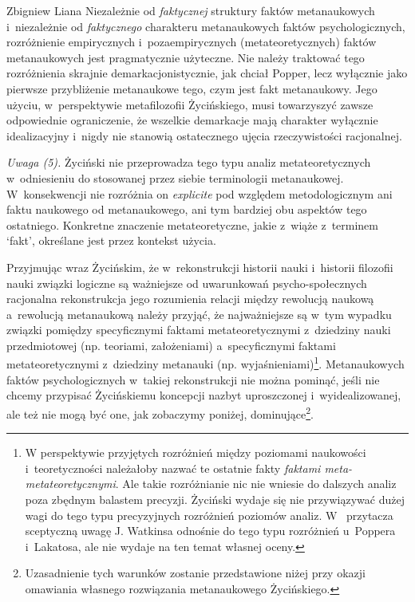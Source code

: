 \begin{artplenv}{Zbigniew Liana}
Niezależnie od \textit{faktycznej} struktury faktów metanaukowych i~niezależnie od \textit{faktycznego} charakteru
metanaukowych faktów psychologicznych, rozróżnienie empirycznych i~pozaempirycznych (metateoretycznych) faktów
metanaukowych jest pragmatycznie użyteczne. Nie należy traktować tego rozróżnienia skrajnie demarkacjonistycznie, jak
chciał Popper, lecz wyłącznie jako pierwsze przybliżenie metanaukowe tego, czym jest fakt metanaukowy. Jego użyciu, w~perspektywie
metafilozofii Życińskiego, musi towarzyszyć zawsze odpowiednie ograniczenie, że wszelkie demarkacje mają
charakter wyłącznie idealizacyjny i~nigdy nie stanowią ostatecznego ujęcia rzeczywistości racjonalnej.

\textit{Uwaga (5).} Życiński nie przeprowadza tego typu analiz metateoretycznych w~odniesieniu do stosowanej przez siebie
terminologii metanaukowej. W~konsekwencji nie rozróżnia on \textit{explicite} pod względem metodologicznym ani faktu
naukowego od metanaukowego, ani tym bardziej obu aspektów tego ostatniego. Konkretne znaczenie metateoretyczne,
jakie z~wiąże z~terminem `fakt', określane jest przez kontekst użycia.

Przyjmując wraz Życińskim, że w~rekonstrukcji historii nauki i~historii filozofii nauki związki logiczne są ważniejsze
od uwarunkowań psycho-społecznych racjonalna rekonstrukcja jego rozumienia relacji między rewolucją naukową a~rewolucją
metanaukową należy przyjąć, że najważniejsze są w~tym wypadku związki pomiędzy specyficznymi faktami
metateoretycznymi z~dziedziny nauki przedmiotowej (np. teoriami, założeniami) a~specyficznymi faktami metateoretycznymi z~dziedziny
metanauki (np. wyjaśnieniami)\footnote{W perspektywie przyjętych rozróżnień między poziomami naukowości i~teoretyczności
należałoby nazwać te ostatnie fakty \textit{faktami meta-metateoretycznymi}. Ale takie rozróżnianie nic
nie wniesie do dalszych analiz poza zbędnym balastem precyzji. Życiński wydaje się nie przywiązywać dużej wagi do tego
typu precyzyjnych rozróżnień poziomów analiz.
W~\parencite[s.~123]{zycinski_jezyk_1983}
przytacza sceptyczną uwagę J. Watkinsa odnośnie do tego typu rozróżnień u~Poppera i~Lakatosa, ale nie wydaje na
ten temat własnej oceny.}. Metanaukowych faktów psychologicznych w~takiej rekonstrukcji nie można pominąć, jeśli nie
chcemy przypisać Życińskiemu koncepcji nazbyt uproszczonej i~wyidealizowanej, ale też nie mogą być one, jak zobaczymy
poniżej, dominujące\footnote{Uzasadnienie tych warunków zostanie przedstawione niżej przy okazji omawiania własnego
rozwiązania metanaukowego Życińskiego.}.


\end{artplenv}
